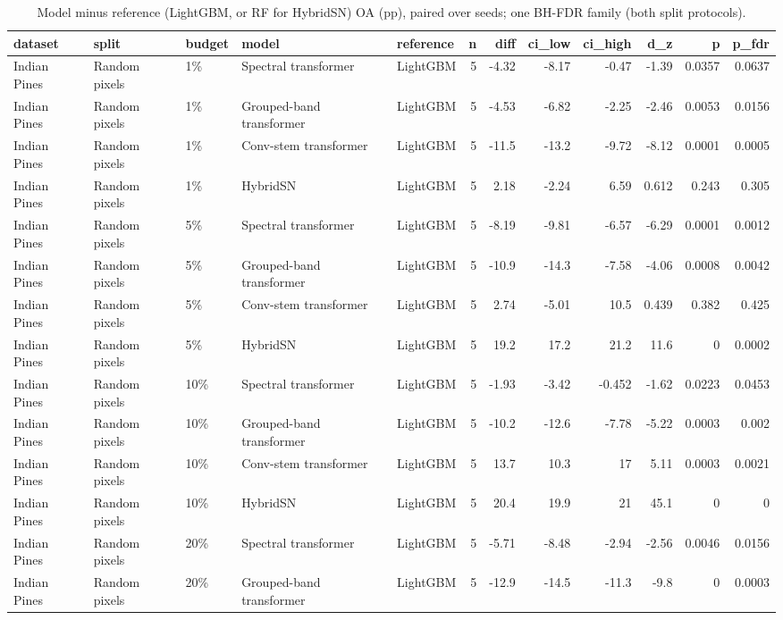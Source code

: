 \begin{table}
\caption{Model minus reference (LightGBM, or RF for HybridSN) OA (pp), paired over seeds; one BH-FDR family (both split protocols).}
\label{tab:stats_airborne_vs_lightgbm}
\begin{tabular}{lllllrrrrrrr}
\toprule
dataset & split & budget & model & reference & n & diff & ci\_low & ci\_high & d\_z & p & p\_fdr \\
\midrule
Indian Pines & Random pixels & 1\% & Spectral transformer & LightGBM & 5 & -4.32 & -8.17 & -0.47 & -1.39 & 0.0357 & 0.0637 \\
Indian Pines & Random pixels & 1\% & Grouped-band transformer & LightGBM & 5 & -4.53 & -6.82 & -2.25 & -2.46 & 0.0053 & 0.0156 \\
Indian Pines & Random pixels & 1\% & Conv-stem transformer & LightGBM & 5 & -11.5 & -13.2 & -9.72 & -8.12 & 0.0001 & 0.0005 \\
Indian Pines & Random pixels & 1\% & HybridSN & LightGBM & 5 & 2.18 & -2.24 & 6.59 & 0.612 & 0.243 & 0.305 \\
Indian Pines & Random pixels & 5\% & Spectral transformer & LightGBM & 5 & -8.19 & -9.81 & -6.57 & -6.29 & 0.0001 & 0.0012 \\
Indian Pines & Random pixels & 5\% & Grouped-band transformer & LightGBM & 5 & -10.9 & -14.3 & -7.58 & -4.06 & 0.0008 & 0.0042 \\
Indian Pines & Random pixels & 5\% & Conv-stem transformer & LightGBM & 5 & 2.74 & -5.01 & 10.5 & 0.439 & 0.382 & 0.425 \\
Indian Pines & Random pixels & 5\% & HybridSN & LightGBM & 5 & 19.2 & 17.2 & 21.2 & 11.6 & 0 & 0.0002 \\
Indian Pines & Random pixels & 10\% & Spectral transformer & LightGBM & 5 & -1.93 & -3.42 & -0.452 & -1.62 & 0.0223 & 0.0453 \\
Indian Pines & Random pixels & 10\% & Grouped-band transformer & LightGBM & 5 & -10.2 & -12.6 & -7.78 & -5.22 & 0.0003 & 0.002 \\
Indian Pines & Random pixels & 10\% & Conv-stem transformer & LightGBM & 5 & 13.7 & 10.3 & 17 & 5.11 & 0.0003 & 0.0021 \\
Indian Pines & Random pixels & 10\% & HybridSN & LightGBM & 5 & 20.4 & 19.9 & 21 & 45.1 & 0 & 0 \\
Indian Pines & Random pixels & 20\% & Spectral transformer & LightGBM & 5 & -5.71 & -8.48 & -2.94 & -2.56 & 0.0046 & 0.0156 \\
Indian Pines & Random pixels & 20\% & Grouped-band transformer & LightGBM & 5 & -12.9 & -14.5 & -11.3 & -9.8 & 0 & 0.0003 \\

\end{tabular}
\end{table}
